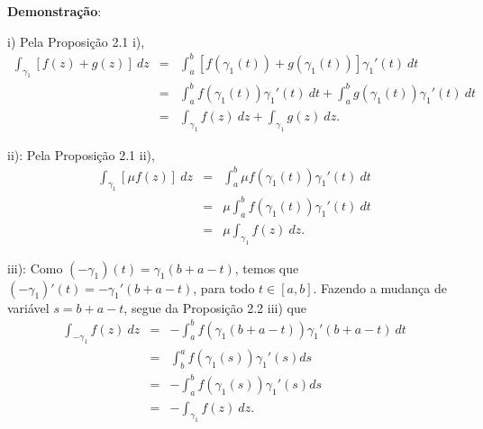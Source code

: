 


\textbf{Demonstração}:

i) Pela Proposição 2.1 i),
\begin{eqnarray*}
\displaystyle\int_{\gamma_1} [f(z)+g(z)]~dz
&=& \displaystyle\int_{a}^{b} [f({\gamma_1}(t))+g({\gamma_1}(t))]{\gamma_1}'(t)~dt\\
&=& \displaystyle\int_{a}^{b} f({\gamma_1}(t)){\gamma_1}'(t)~dt + \displaystyle\int_{a}^{b} g({\gamma_1}(t)) {\gamma_1}'(t)~dt\\
&=& \displaystyle\int_{\gamma_1} f(z)~dz + \displaystyle\int_{\gamma_1} g(z)~dz.
\end{eqnarray*}

ii): Pela Proposição 2.1 ii),
\begin{eqnarray*}
\displaystyle\int_{\gamma_1} [\mu f(z)]~dz
&=& \displaystyle\int_{a}^{b} \mu f(\gamma_1(t))\gamma_1'(t)~dt\\
&=& \mu \displaystyle\int_{a}^{b} f(\gamma_1(t))\gamma_1'(t)~dt\\
&=& \mu \displaystyle\int_{\gamma_1} f(z)~dz.
\end{eqnarray*}

iii): Como $(-\gamma_1)(t) = \gamma_1(b+a-t)$, temos que $(-\gamma_1)'(t) = -\gamma_1'(b+a-t)$, para todo $t \in [a, b]$. Fazendo a mudança de variável $s=b+a-t$, segue da Proposição 2.2 iii) que
\begin{eqnarray*}
\displaystyle\int_{-\gamma_1} f(z)~dz
&=& -\displaystyle\int_{a}^{b} f(\gamma_1(b+a-t))\gamma_1'(b+a-t)~dt \\
&=& \displaystyle\int_{b}^{a} f(\gamma_1(s))\gamma_1'(s) ds\\
&=& -\displaystyle\int_{a}^{b} f(\gamma_1(s))\gamma_1'(s) ds\\
&=& -\displaystyle\int_{\gamma_1} f(z)~dz.
\end{eqnarray*}

